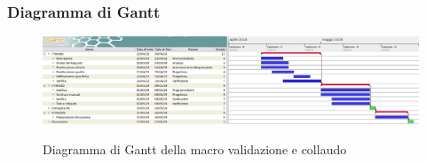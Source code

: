         \begin{landscape}
			\subsubsection{Diagramma di Gantt}
			\begin{figure}[H]
					\centering
					\includegraphics[scale=0.42]{img/Validazione_e_collaudo.png}\\
					\caption{Diagramma di Gantt della macro validazione e collaudo}
			\end{figure}
		\end{landscape}
		\newpage
